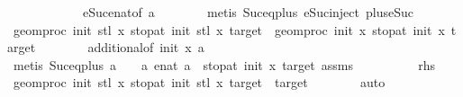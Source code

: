 \begin{isabellebody}
\ \ \ \ \ \ \ \ \ \ \ \ eSuc{\isacharunderscore}{\kern0pt}enat{\isacharbrackleft}{\kern0pt}of\ a{\isacharbrackright}{\kern0pt}\isanewline
\ \ \ \ \ \ \isamarkupfalse%
\ {\isacharparenleft}{\kern0pt}metis\ Suc{\isacharunderscore}{\kern0pt}eq{\isacharunderscore}{\kern0pt}plus{}\ eSuc{\isacharunderscore}{\kern0pt}inject\ plus{\isacharunderscore}{\kern0pt}{}{\isacharunderscore}{\kern0pt}eSuc{\isacharparenleft}{\kern0pt}{}{\isacharparenright}{\kern0pt}{\isacharparenright}{\kern0pt}\ \isanewline
\ \ \ \ \isamarkupfalse%
\ \isamarkupfalse%
\ {\isachardoublequoteopen}geom{\isacharunderscore}{\kern0pt}proc\ init{\isacharprime}{\kern0pt}\ {\isacharparenleft}{\kern0pt}stl\ x{\isacharparenright}{\kern0pt}\ {\isacharparenleft}{\kern0pt}stop{\isacharunderscore}{\kern0pt}at\ init{\isacharprime}{\kern0pt}\ {\isacharparenleft}{\kern0pt}stl\ x{\isacharparenright}{\kern0pt}\ target{\isacharparenright}{\kern0pt}\ {\isacharequal}{\kern0pt}\ geom{\isacharunderscore}{\kern0pt}proc\ init\ x\ {\isacharparenleft}{\kern0pt}stop{\isacharunderscore}{\kern0pt}at\ init\ x\ target{\isacharparenright}{\kern0pt}{\isachardoublequoteclose}\isanewline
\ \ \ \ \ \ \isamarkupfalse%
\ additional{}{\isacharbrackleft}{\kern0pt}of\ init\ x\ a{\isacharbrackright}{\kern0pt}\isanewline
\ \ \ \ \ \ \isamarkupfalse%
\ {\isacharparenleft}{\kern0pt}metis\ Suc{\isacharunderscore}{\kern0pt}eq{\isacharunderscore}{\kern0pt}plus{}\ {\isacartoucheopen}a\ {\isacharplus}{\kern0pt}\ {}\ {\isacharequal}{\kern0pt}\ a{\isacharprime}{\kern0pt}{\isacartoucheclose}\ {\isacartoucheopen}enat\ a{\isacharprime}{\kern0pt}\ {\isacharequal}{\kern0pt}\ stop{\isacharunderscore}{\kern0pt}at\ init\ x\ target{\isacartoucheclose}\ assms{\isacharparenleft}{\kern0pt}{}{\isacharparenright}{\kern0pt}{\isacharparenright}{\kern0pt}\ \ \ \ \isanewline
\ \ \ \ \isamarkupfalse%
\ rhs{}\ \isamarkupfalse%
\ {\isachardoublequoteopen}geom{\isacharunderscore}{\kern0pt}proc\ init{\isacharprime}{\kern0pt}\ {\isacharparenleft}{\kern0pt}stl\ x{\isacharparenright}{\kern0pt}\ {\isacharparenleft}{\kern0pt}stop{\isacharunderscore}{\kern0pt}at\ init{\isacharprime}{\kern0pt}\ {\isacharparenleft}{\kern0pt}stl\ x{\isacharparenright}{\kern0pt}\ target{\isacharparenright}{\kern0pt}\ {\isacharequal}{\kern0pt}\ target{\isachardoublequoteclose}\isanewline
\ \ \ \ \ \ \isamarkupfalse%
\ auto\isanewline
\ \ \isamarkupfalse%

\end{isabellebody}
